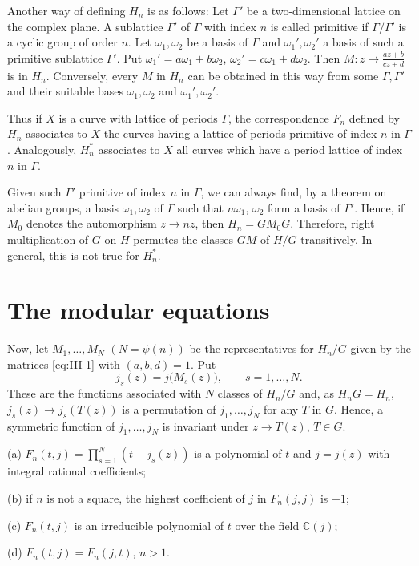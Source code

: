 Another way of defining $H_{n}$ is as follows: Let $\Gamma'$ be a
two-dimensional lattice on the complex plane. A sublattice $\Gamma'$ of
$\Gamma$ with index $n$ is called primitive if $\Gamma/\Gamma'$ is a
cyclic group of order $n$. Let $\omega_{1},\omega_{2}$ be a basis of
$\Gamma$ and $\omega_{1}',\omega_{2}'$ a basis of such a primitive
sublattice $\Gamma'$. Put
$\omega_{1}'=a\omega_{1}+b\omega_{2}$,
$\omega_{2}'=c\omega_{1}+d\omega_{2}$. Then
$M:z\longrightarrow\frac{az+b}{cz+d}$ is in $H_{n}$. Conversely, every $M$
in $H_{n}$ can be obtained in this way from some $\Gamma,\Gamma'$ and
their suitable bases $\omega_{1},\omega_{2}$ and
$\omega_{1}',\omega_{2}'$.

Thus if $X$ is a curve with lattice of periods $\Gamma$, the
correspondence $F_{n}$ defined by $H_{n}$ associates to $X$ the curves
having a lattice of periods primitive of index $n$ in $\Gamma$.
Analogously, $H_{n}^{*}$ associates to $X$ all curves which have a period
lattice of index $n$ in $\Gamma$.

Given such $\Gamma'$ primitive of index $n$ in $\Gamma$, we can always
find, by a theorem on abelian groups, a basis $\omega_{1},\omega_{2}$ of
$\Gamma$ such that $n\omega_{1}$, $\omega_{2}$ form a basis of $\Gamma'$.
Hence, if $M_{0}$ denotes the automorphism $z\longrightarrow nz$, then
$H_{n}=GM_{0}G$. Therefore, right multiplication of $G$ on $H$ permutes
the classes $GM$ of $H/G$ transitively. In general, this is not true for
$H_{n}^{*}$.

\section{The modular equations}\label{sec:III-modeq}

Now, let $M_{1},\ldots,M_{N}$ $(N=\psi(n))$ be the representatives for
$H_{n}/G$ given by the matrices \eqref{eq:III-1} with $(a,b,d)=1$. Put
\[
j_{s}(z)=j\bigl(M_{s}(z)\bigr),\qquad s=1,\dots,N.
\]
These are the functions associated with $N$ classes of $H_{n}/G$ and, as
$H_{n}G=H_{n}$, $j_{s}(z)\longrightarrow j_{s}(T(z))$ is a permutation of
$j_{1},\ldots,j_{N}$ for any $T$ in $G$. Hence, a symmetric function of
$j_{1},\ldots,j_{N}$ is invariant under $z\longrightarrow T(z)$,
$T\in G$.

\begin{theorem}\label{thm:III-1}
(a) $F_{n}(t,j)=\prod_{s=1}^{N}(t-j_{s}(z))$ is a polynomial of $t$ and
$j=j(z)$ with integral rational coefficients;

(b) if $n$ is not a square, the highest coefficient of $j$ in
$F_{n}(j,j)$ is $\pm 1$;

(c) $F_{n}(t,j)$ is an irreducible polynomial of $t$ over the field
$\mathbb{C}(j)$;

(d) $F_{n}(t,j)=F_{n}(j,t)$, $n>1$.
\end{theorem}

